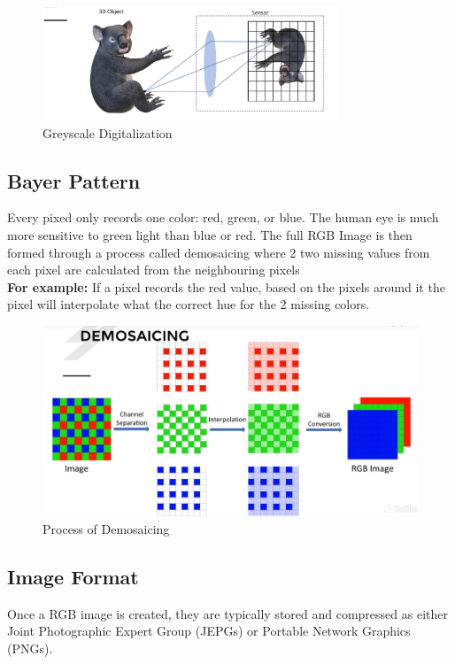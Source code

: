 \documentclass[fleqn]{article}
\begin{document}
    \begin{figure}[h!]
      \centering
      \includegraphics[width=250pt]{koala.png}
      \caption{Greyscale Digitalization }
      \label{fig: Greyscale Representation of an Image}
    \end{figure}



    \newpage
    \clearpage
    \subsection{Bayer Pattern}
    Every pixed only records one color: red, green, or blue. The human eye is much more sensitive to green light than blue or red. The full RGB Image is then formed through a process called demosaicing where 2 two missing values from each pixel are calculated from the neighbouring pixels\\
    \textbf{For example:} If a pixel records the red value, based on the pixels around it the pixel will interpolate what the correct hue for the 2 missing colors.

    \begin{figure}[h!]
      \centering
      \includegraphics[width=550pt]{demosaicing.png}
      \caption{Process of Demosaicing}
      \label{fig: How the total RGB Image is found through demosaicing}
    \end{figure}

    \subsection{Image Format}
    Once a RGB image is created, they are typically stored and compressed as either Joint Photographic Expert Group (JEPGs) or Portable Network Graphics (PNGs).
\end{document}

